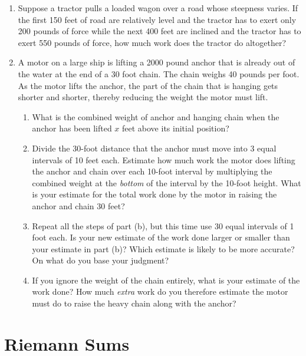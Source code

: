 \begin{enumerate}
\item Suppose a tractor pulls a loaded wagon over a road whose
steepness varies.  If the first 150 feet of road are relatively level
and the tractor has to exert only 200 pounds of force while the next
400 feet are inclined and the tractor has to exert 550 pounds of
force, how much work does the tractor do altogether?


\item A motor on a large ship is lifting a 2000 pound anchor that is
already out of the water at the end of a 30 foot chain.  The chain
weighs 40 pounds per foot.  As the motor lifts the anchor, the part of
the chain that is hanging gets shorter and shorter, thereby reducing
the weight the motor must lift.

  \begin{enumerate}
  \item What is the combined weight of anchor and hanging chain when the
anchor has been lifted $x$ feet above its initial position?

  \item Divide the 30-foot distance that the anchor must move into 3
equal intervals of 10 feet each.  Estimate how much work the motor
does lifting the anchor and chain over each 10-foot interval by
multiplying the combined weight at the {\em bottom\/} of the interval
by the 10-foot height.  What is your estimate for the total work done
by the motor in raising the anchor and chain 30 feet?

  \item Repeat all the steps of part (b), but this time use 30 equal
intervals of 1 foot each.  Is your new estimate of the work done
larger or smaller than your estimate in part (b)?  Which estimate is
likely to be more accurate?  On what do you base your judgment?

  \item If you ignore the weight of the chain entirely, what is your
estimate of the work done?  How much {\em extra\/} work do you
therefore estimate the motor must do to raise the heavy chain along
with the anchor?






\end{enumerate}
\end{enumerate}
\section{Riemann Sums}
\label{sec:riemann-sums}

